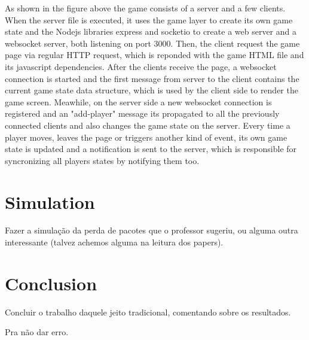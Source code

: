 \documentclass[english]{sbrt}
\begin{document}
As shown in the figure above the game consists of a server and a few clients. When the server file is executed, it uses the game layer to create its own game state and the Nodejs libraries express and socketio to create a web server and a websocket server, both listening on port 3000.
Then, the client request the game page via regular HTTP request, which is reponded with the game HTML file and its javascript dependencies. After the clients receive the page, a websocket connection is started and the first message from server to the client contains the current
game state data structure, which is used by the client side to render the game screen. Meawhile, on the server side a new websocket connection is registered and an "add-player" message its propagated to all the previously connected clients and also changes the game state on the server.
Every time a player moves, leaves the page or triggers another kind of event, its own game state is updated and a notification is sent to the server, which is responsible for syncronizing all players states by notifying them too.

\section{\textbf{Simulation}}
Fazer a simulação da perda de pacotes que o professor sugeriu, ou alguma outra interessante (talvez achemos alguma na leitura dos papers).

\section{\textbf{Conclusion}}
Concluir o trabalho daquele jeito tradicional, comentando sobre os resultados.

\cite{maodv01} Pra não dar erro.



\end{document}
